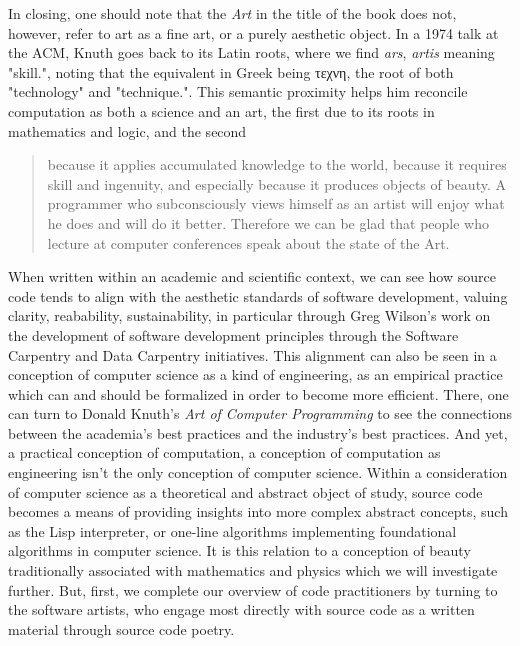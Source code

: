 In closing, one should note that the \emph{Art} in the title of the book does not, however, refer to art as a fine art, or a purely aesthetic object. In a 1974 talk at the ACM, Knuth goes back to its Latin roots, where we find \emph{ars}, \emph{artis} meaning "skill.", noting that the equivalent in Greek being τεχνη, the root of both "technology" and "technique.". This semantic proximity helps him reconcile computation as both a science and an art, the first due to its roots in mathematics and logic, and the second

\begin{quote}
  because it applies accumulated knowledge to the world, because it requires skill and ingenuity, and especially because it produces objects of beauty. A programmer who subconsciously views himself as an artist will enjoy what he does and will do it better. Therefore we can be glad that people who lecture at computer conferences speak about the state of the Art.\cite{knuth_computer_1974}
\end{quote}

\vspace*{1\baselineskip}

When written within an academic and scientific context, we can see how source code tends to align with the aesthetic standards of software development, valuing clarity, reabability, sustainability, in particular through Greg Wilson's work on the development of software development principles through the Software Carpentry and Data Carpentry initiatives. This alignment can also be seen in a conception of computer science as a kind of engineering, as an empirical practice which can and should be formalized in order to become more efficient. There, one can turn to Donald Knuth's \emph{Art of Computer Programming} to see the connections between the academia's best practices and the industry's best practices. And yet, a practical conception of computation, a conception of computation as engineering isn't the only conception of computer science. Within a consideration of computer science as a  theoretical and abstract object of study, source code becomes a means of providing insights into more complex abstract concepts, such as the Lisp interpreter, or one-line algorithms implementing foundational algorithms in computer science. It is this relation to a conception of beauty traditionally associated with mathematics and physics which we will investigate further. But, first, we complete our overview of code practitioners by turning to the software artists, who engage most directly with source code as a written material through source code poetry.

